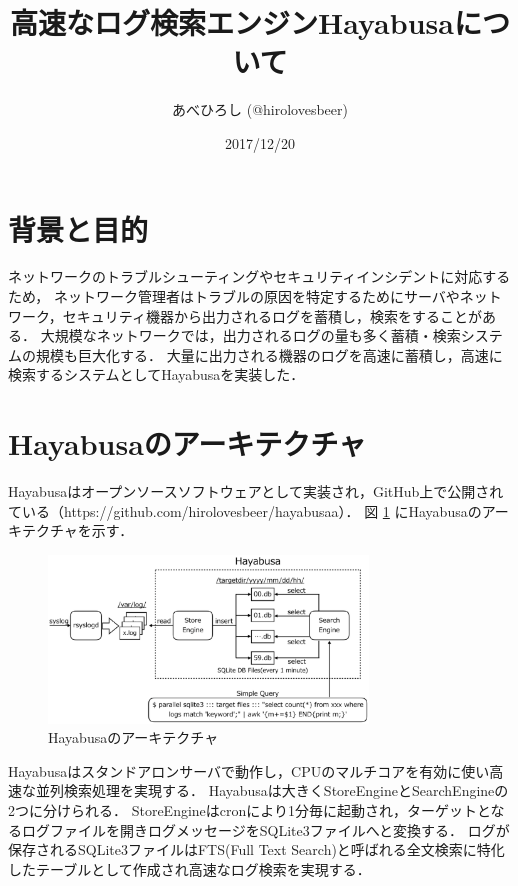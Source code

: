 \documentclass[twocolumn,10pt]{jarticle}
\title{高速なログ検索エンジンHayabusaについて}
\author{あべひろし (@hirolovesbeer)}
\date{2017/12/20}
\begin{document}
\maketitle
\thispagestyle{empty}

\section{背景と目的}
ネットワークのトラブルシューティングやセキュリティインシデントに対応するため，
ネットワーク管理者はトラブルの原因を特定するためにサーバやネットワーク，セキュリティ機器から出力されるログを蓄積し，検索をすることがある．
大規模なネットワークでは，出力されるログの量も多く蓄積・検索システムの規模も巨大化する．
大量に出力される機器のログを高速に蓄積し，高速に検索するシステムとしてHayabusa\cite{hayabusa}を実装した．


\section{Hayabusaのアーキテクチャ}
Hayabusaはオープンソースソフトウェアとして実装され，GitHub上で公開されている（https://github.com/hirolovesbeer/hayabusaa）．
図 \ref{fig:hayabusa-arch} にHayabusaのアーキテクチャを示す．
\begin{figure}[h]
\centering
\includegraphics[width=85mm]{./pictures/hayabusa-arch.eps}
\caption{Hayabusaのアーキテクチャ}
\label{fig:hayabusa-arch}
\end{figure}

Hayabusaはスタンドアロンサーバで動作し，CPUのマルチコアを有効に使い高速な並列検索処理を実現する．
Hayabusaは大きくStoreEngineとSearchEngineの2つに分けられる．
StoreEngineはcronにより1分毎に起動され，ターゲットとなるログファイルを開きログメッセージをSQLite3ファイルへと変換する．
ログが保存されるSQLite3ファイルはFTS(Full Text Search)と呼ばれる全文検索に特化したテーブルとして作成され高速なログ検索を実現する．
\end{document}
